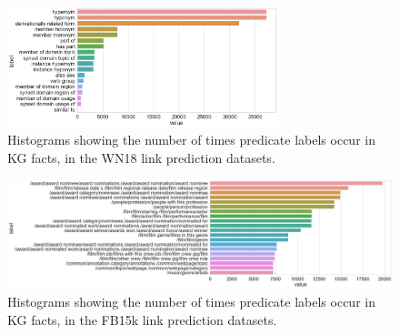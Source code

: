 \begin{figure}[H]
   	\centering
    	\includegraphics[width=0.7\textwidth, height=0.2\textheight]{WN18_Predicate_Counts}
	\caption{Histograms showing the number of times predicate labels occur in KG facts, in the WN18 link prediction datasets.}
\end{figure}

\begin{figure}[H]
   	\centering
    	\includegraphics[width=1.0\textwidth, height=0.2\textheight]{FB15k_Predicate_Counts}
	\captionsetup{justification=centering}
	\caption{Histograms showing the number of times predicate labels occur in KG facts, in the FB15k link prediction datasets.}
\end{figure}



